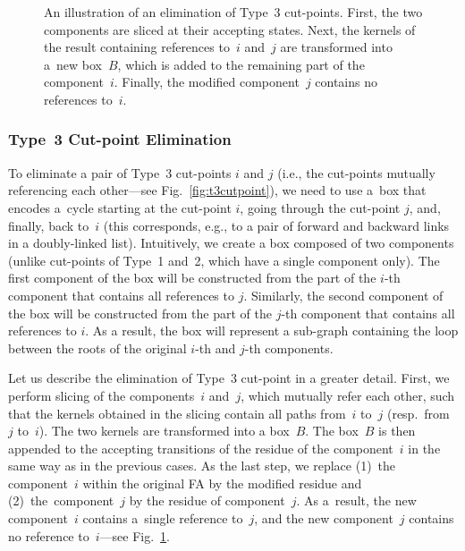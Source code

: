 {\begin{figure}[t]
  \caption{An illustration of an elimination of Type~3 cut-points. First, the two components are
  sliced at their accepting states. Next, the kernels of the result containing
  references to~$i$ and~$j$ are transformed into a~new box~$B$, which is added to the remaining part of the component~$i$.
  Finally, the modified component~$j$ contains no references to~$i$.}
  \label{fig:type3folding}
\end{figure}

\subsubsection*{Type~3 Cut-point Elimination}
To eliminate a pair of Type~3 cut-points $i$ and $j$ (i.e., the cut-points
mutually referencing
each other---see Fig.~\ref{fig:t3cutpoint}), we need to use a~box that encodes a~cycle
starting at the cut-point $i$, going through the cut-point $j$, and, finally, back to~$i$ (this
corresponds, e.g., to a pair of forward and backward links in a doubly-linked list).
Intuitively, we create a box composed of two components (unlike cut-points of
Type~1 and~2,
which have a single component only). The first component of the box will be constructed from the part of the
$i$-th component that contains all references to $j$. Similarly, the second component of
the box will be constructed from the part of the $j$-th component that contains all references to $i$. 
As a result, the box will represent a sub-graph containing the loop between the roots of the original $i$-th and $j$-th components.

Let us describe the elimination of Type~3 cut-point in a greater detail. First, we perform
slicing of the components~$i$ and~$j$, which mutually refer each other, such that
the kernels obtained in the slicing
contain all paths from~$i$ to~$j$ (resp.\ from~$j$ to~$i$).
The two kernels are
transformed into a box~$B$. The box~$B$ is then appended to the accepting transitions of
the residue of the component~$i$ in the same way as in the previous cases. As the last step,
we replace (1)~the component~$i$ within the original FA by the modified residue
and (2)~the~component~$j$ by the residue of component~$j$.
As a~result, the new component~$i$ contains a~single reference to~$j$, and the
new component~$j$ contains no reference to~$i$---see
Fig.~\ref{fig:type3folding}.

}
